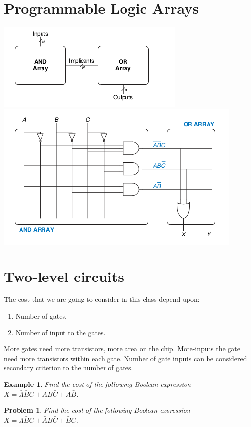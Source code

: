 \documentclass{article}
\newtheorem{example}{Example}
\newtheorem{prob}{Problem}
\newcommand{\bA}{\bar{A}}
\newcommand{\bB}{\bar{B}}
\newcommand{\bC}{\bar{C}}
\begin{document}
\section{Programmable Logic Arrays}
\includegraphics[width=0.5\linewidth]{figures/PLA-abstract.png}
\includegraphics[width=0.5\linewidth]{figures/PLA-logic.png}

\section{Two-level circuits}
The cost that we are going to consider in this class depend upon:
\begin{enumerate}
\item Number of gates.
\item Number of input to the gates.
\end{enumerate}
More gates need more transistors, more area on the chip. More-inputs the gate
need more transistors within each gate. Number of gate inputs can be considered
secondary criterion to the number of gates.

\begin{example}
  Find the cost of the following Boolean expression $X = \bA\bB C + AB\bC + A\bB$.
\end{example}

\begin{prob}
  Find the cost of the following Boolean expression $X = A\bB C + \bA B\bC + \bB
  C$.
\end{prob}
\end{document}
